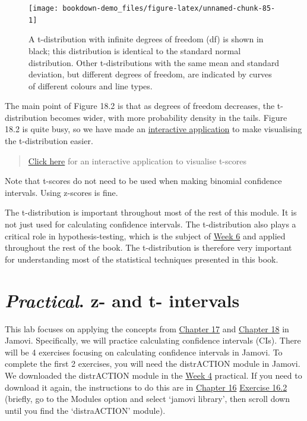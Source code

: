 \documentclass[
]{scrbook}
\begin{document}
\begin{figure}
\texttt{[image: bookdown-demo\_files/figure-latex/unnamed-chunk-85-1]} \caption{A t-distribution with infinite degrees of freedom (df) is shown in black; this distribution is identical to the standard normal distribution. Other t-distributions with the same mean and standard deviation, but different degrees of freedom, are indicated by curves of different colours and line types.}\label{fig:unnamed-chunk-85}
\end{figure}

The main point of Figure 18.2 is that as degrees of freedom decreases, the t-distribution becomes wider, with more probability density in the tails.
Figure 18.2 is quite busy, so we have made an \href{https://bradduthie.shinyapps.io/t_score/}{interactive application} to make visualising the t-distribution easier.

\begin{quote}
\href{https://bradduthie.shinyapps.io/t_score/}{Click here} for an interactive application to visualise t-scores
\end{quote}

Note that t-scores do not need to be used when making binomial confidence intervals.
Using z-scores is fine.

The t-distribution is important throughout most of the rest of this module.
It is not just used for calculating confidence intervals.
The t-distribution also plays a critical role in hypothesis-testing, which is the subject of \protect\hyperlink{Week_6}{Week 6} and applied throughout the rest of the book.
The t-distribution is therefore very important for understanding most of the statistical techniques presented in this book.

\hypertarget{Chapter_19}{%
\chapter{\texorpdfstring{\emph{Practical}. z- and t- intervals}{Practical. z- and t- intervals}}\label{Chapter_19}}

This lab focuses on applying the concepts from \protect\hyperlink{Chapter_17}{Chapter 17} and \protect\hyperlink{Chapter_18}{Chapter 18} in Jamovi.
Specifically, we will practice calculating confidence intervals (CIs).
There will be 4 exercises focusing on calculating confidence intervals in Jamovi.
To complete the first 2 exercises, you will need the distrACTION module in Jamovi.
We downloaded the distrACTION module in the \protect\hyperlink{Week_4}{Week 4} practical.
If you need to download it again, the instructions to do this are in \protect\hyperlink{Chapter_16}{Chapter 16} \href{https://bradduthie.github.io/SCIU4T4/Chapter_16.html\#probabilities-from-a-normal-distribution}{Exercise 16.2} (briefly, go to the Modules option and select `jamovi library', then scroll down until you find the `distraACTION' module).
\end{document}
